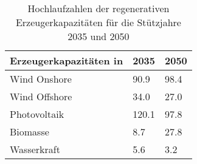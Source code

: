 {
\renewcommand{\arraystretch}{1.2}%
\begin{table}[H]
	\begin{center}
		\caption{Hochlaufzahlen der regenerativen Erzeugerkapazitäten für die Stützjahre \num{2035} und \num{2050}}
		\begin{tabu} to \textwidth {X[1] X[1, r] X[1, r]}
			\hline
			Erzeugerkapazitäten   in \si{\gw} & \num{2035}  & \num{2050} \\ \hline
			Wind Onshore                      & \num{90.9}  & \num{98.4} \\
			Wind Offshore                     & \num{34.0}  & \num{27.0} \\
			Photovoltaik                      & \num{120.1} & \num{97.8} \\
			Biomasse                          & \num{8.7}   & \num{27.8} \\
			Wasserkraft                       & \num{5.6}   & \num{3.2}  \\ \hline
		\end{tabu}
		\label{tab:EE-RampUp}
	\end{center}
	\vspace{-3mm}%
\end{table}
}
